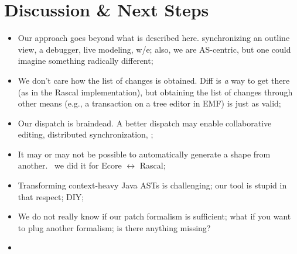 \documentclass[sigplan]{acmart}
\begin{document}
\section{Discussion \& Next Steps}
\begin{itemize}
	\item Our approach goes beyond what is described here. \eg synchronizing an outline view, a debugger, live modeling, w/e; also, we are AS-centric, but one could imagine something radically different;
	\item We don’t care how the list of changes is obtained. Diff is \emph{a} way to get there (as in the Rascal implementation), but obtaining the list of changes through other means (e.g., a transaction on a tree editor in EMF) is just as valid;
	\item Our dispatch is braindead. A better dispatch may enable collaborative editing, distributed synchronization, \etc;
	\item It may or may not be possible to automatically generate a shape from another. \eg~we did it for Ecore $\leftrightarrow$ Rascal;
	\item Transforming context-heavy Java ASTs is challenging; our tool is stupid in that respect; DIY;
	\item We do not really know if our patch formalism is sufficient; what if you want to plug another formalism; is there anything missing?
	\item \cite{lammel2005mappings}
\end{itemize}

\clearpage
\balance


\end{document}
